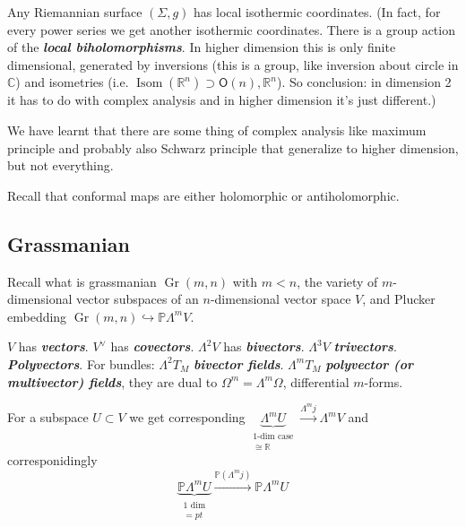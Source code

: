 \begin{claim}\leavevmode
Any Riemannian surface \((\Sigma,g)\) has local isothermic coordinates. (In fact, for every power series we get another isothermic coordinates. There is a group action of the \textit{\textbf{local biholomorphisms}}. In higher dimension this is only finite dimensional, generated by inversions (this is a group, like inversion about circle in \(\mathbb{C}\)) and isometries (i.e. \(\operatorname{Isom}(\mathbb{R}^n) \supset\mathsf{O}(n),\mathbb{R}^n\)). So conclusion: in dimension 2 it has to do with complex analysis and in higher dimension it's just different.)
\end{claim}

\begin{thing7}{We have learnt}\leavevmode
that there are some thing of complex analysis like maximum principle and probably also Schwarz principle that generalize to higher dimension, but not everything.
\end{thing7}

\begin{remark}\leavevmode
Recall that conformal maps are either holomorphic or antiholomorphic.
\end{remark}

\subsection{Grassmanian}

Recall what is grassmanian \(\operatorname{Gr}(m,n)\) with \(m<n\), the variety of \(m\)-dimensional vector subspaces of an \(n\)-dimensional vector space \(V\), and Plucker embedding \(\operatorname{Gr}(m,n)\hookrightarrow \mathbb{P}\Lambda^{m}V\).


\begin{defn}\leavevmode
\(V\) has \textit{\textbf{vectors}}. \(V^\vee\) has \textit{\textbf{covectors}}.  \(\Lambda^{2}V\) has \textit{\textbf{bivectors}}.  \(\Lambda^{3}V\) \textit{\textbf{trivectors}}.  \textit{\textbf{Polyvectors}}. For bundles:  \(\Lambda^{2}T_M\) \textit{\textbf{bivector fields}}.  \(\Lambda^{m}T_M\) \textit{\textbf{polyvector (or multivector) fields}}, they are dual to  \(\Omega^{m}=\Lambda^{m}\Omega\), differential \(m\)-forms.
\end{defn}
For a subspace \(U \subset V\) we get corresponding \(\underbrace{\Lambda^{m}U }_{\substack{\text{1-dim case}  \\ \cong\mathbb{R}}}\xrightarrow{\Lambda^{m}j}\Lambda^{m}V\)
and corresponidingly
\[\underbrace{\mathbb{P}\Lambda^{m}U}_{\substack{\text{1 dim}  \\ =pt}}\xrightarrow{\mathbb{P}(\Lambda^{m}j)}\mathbb{P}\Lambda^{m}U\]

